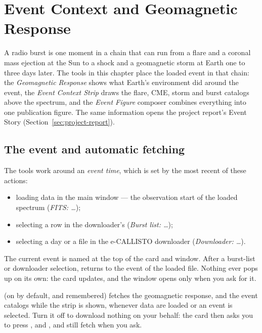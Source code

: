 \chapter{Event Context and Geomagnetic Response}
\label{ch:event-context}

A radio burst is one moment in a chain that can run from a flare and a coronal mass ejection
at the Sun to a shock and a geomagnetic storm at Earth one to three days later. The tools in
this chapter place the loaded event in that chain: the \emph{Geomagnetic Response} shows what
Earth's environment did around the event, the \emph{Event Context Strip} draws the flare, CME,
storm and burst catalogs above the spectrum, and the \emph{Event Figure} composer combines
everything into one publication figure. The same information opens the project report's
Event Story (Section~\ref{sec:project-report}).

\section{The event and automatic fetching}
\label{sec:event-time}

The tools work around an \emph{event time}, which is set by the most recent of these actions:
\begin{itemize}
  \item loading data in the main window --- the observation start of the loaded spectrum
    (\emph{FITS: \ldots});
  \item selecting a row in the downloader's  (\emph{Burst list: \ldots});
  \item selecting a day or a file in the e-CALLISTO downloader (\emph{Downloader: \ldots}).
\end{itemize}
The current event is named at the top of the  card and window. After
a burst-list or downloader selection,  returns to the event of the loaded
file. Nothing ever pops up on its own: the card updates, and the window opens only when you ask
for it.

 (on by default, and remembered) fetches
the geomagnetic response, and the event catalogs while the strip is shown, whenever data are
loaded or an event is selected. Turn it off to download nothing on your behalf: the card then
asks you to press , and ,  and
 still fetch when you ask.

